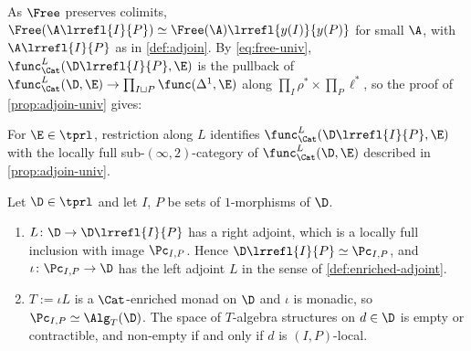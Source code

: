 As $\Free$ preserves colimits, $\Free(\A\lrrefl{I}{P}) \simeq \Free(\A)\lrrefl{y(I)}{y(P)}$ for small $\A$, with $\A\lrrefl{I}{P}$ as in \cref{def:adjoin}.
By \eqref{eq:free-univ}, $\func^{L}_{\Cat}(\D\lrrefl{I}{P},\E)$ is the pullback of $\func^{L}_{\Cat}(\D,\E) \to \prod_{I \sqcup P}\func(\Delta^{1},\E)$ along $\prod_{I}\rho^{*} \times \prod_{P}\ell^{*}$, so the proof of \cref{prop:adjoin-univ} gives:

\begin{prop}
\label{prop:adjoin-univ-pres}
For $\E \in \tprl$, restriction along $L$ identifies $\func^{L}_{\Cat}(\D\lrrefl{I}{P},\E)$ with the locally full sub-$(\infty,2)$-category of $\func^{L}_{\Cat}(\D,\E)$ described in \cref{prop:adjoin-univ}.
\end{prop}

\begin{thm}
\label{thm:2dloc-local}
Let $\D \in \tprl$ and let $I$, $P$ be sets of $1$-morphisms of $\D$.
\begin{enumerate}
\item $L\colon \D \to \D\lrrefl{I}{P}$ has a right adjoint, which is a locally full inclusion with image $\Pc_{I,P}$. Hence $\D\lrrefl{I}{P} \simeq \Pc_{I,P}$, and $\iota\colon \Pc_{I,P} \to \D$ has the left adjoint $L$ in the sense of \cref{def:enriched-adjoint}.
\item $T := \iota L$ is a $\Cat$-enriched monad on $\D$ and $\iota$ is monadic, so $\Pc_{I,P} \simeq \Alg_{T}(\D)$. The space of $T$-algebra structures on $d \in \D$ is empty or contractible, and non-empty if and only if $d$ is $(I,P)$-local.
\end{enumerate}
\end{thm}

